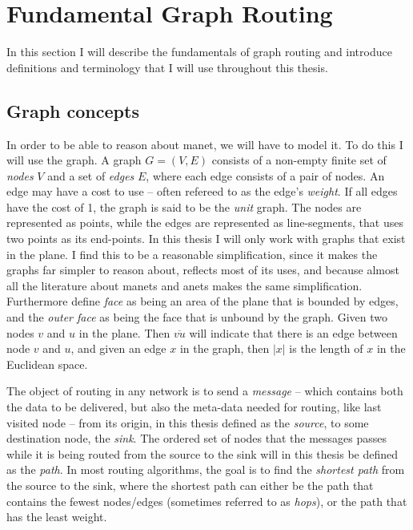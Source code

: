 \section{Fundamental Graph Routing}
\label{section:fundamental_graph_routing}
In this section I will describe the fundamentals of graph routing and introduce definitions and terminology that I will use throughout this thesis.

\subsection{Graph concepts}
\label{section:graph_concepts}
In order to be able to reason about \ac{manet}, we will have to model it. To do this I will use the graph. A graph $G = (V, E)$ consists of a non-empty finite set of \emph{nodes} $V$ and a set of \emph{edges} $E$, where each edge consists of a pair of nodes. An edge may have a cost to use -- often refereed to as the edge's \emph{weight}. If all edges have the cost of 1, the graph is said to be the \emph{unit} graph. The nodes are represented as points, while the edges are represented as line-segments, that uses two points as its end-points. In this thesis I will only work with graphs that exist in the plane. I find this to be a reasonable simplification, since it makes the graphs far simpler to reason about, reflects most of its uses, and because almost all the literature about \acp{manet} and \acp{anet} makes the same simplification. Furthermore define \emph{face} as being an area of the plane that is bounded by edges, and the \emph{outer face} as being the face that is unbound by the graph. Given two nodes $v$ and $u$ in the plane. Then $\overline{vu}$ will indicate that there is an edge between node $v$ and $u$, and given an edge $x$ in the graph, then $|x|$ is the length of $x$ in the Euclidean space.

The object of routing in any network is to send a \emph{message} -- which contains both the data to be delivered, but also the meta-data needed for routing, like last visited node -- from its origin, in this thesis defined as the \emph{source}, to some destination node, the \emph{sink}. The ordered set of nodes that the messages passes while it is being routed from the source to the sink will in this thesis be defined as the \emph{path}. In most routing algorithms, the goal is to find the \emph{shortest path} from the source to the sink, where the shortest path can either be the path that contains the fewest nodes/edges (sometimes referred to as \emph{hops}), or the path that has the least weight.

